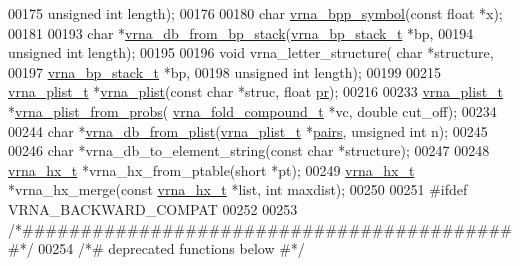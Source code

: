 \begin{DoxyCode}
00175                           \textcolor{keywordtype}{unsigned} \textcolor{keywordtype}{int} length);
00176 
00180 \textcolor{keywordtype}{char} \hyperlink{group__struct__utils_ga025bff1b27fa46534c8fae6980f64bb5}{vrna\_bpp\_symbol}(\textcolor{keyword}{const} \textcolor{keywordtype}{float} *x);
00181 
00193 \textcolor{keywordtype}{char} *\hyperlink{group__struct__utils_ga27bea2c241564af53a065982183389df}{vrna\_db\_from\_bp\_stack}(\hyperlink{group__data__structures_structvrna__bp__stack__s}{vrna\_bp\_stack\_t} *bp,
00194                             \textcolor{keywordtype}{unsigned} \textcolor{keywordtype}{int} length);
00195 
00196 \textcolor{keywordtype}{void} vrna\_letter\_structure( \textcolor{keywordtype}{char} *structure,
00197                             \hyperlink{group__data__structures_structvrna__bp__stack__s}{vrna\_bp\_stack\_t} *bp,
00198                             \textcolor{keywordtype}{unsigned} \textcolor{keywordtype}{int} length);
00199 
00215 \hyperlink{group__data__structures_structvrna__plist__s}{vrna\_plist\_t} *\hyperlink{group__struct__utils_gad4448f5d2c2da0e4ab1731a3586b2542}{vrna\_plist}(\textcolor{keyword}{const} \textcolor{keywordtype}{char} *struc, \textcolor{keywordtype}{float} \hyperlink{fold__vars_8h_ac98ec419070aee6831b44e5c700f090f}{pr});
00216 
00233 \hyperlink{group__data__structures_structvrna__plist__s}{vrna\_plist\_t} *\hyperlink{group__struct__utils_gaa3bf26a0ee2e9f2225afbaee44a37264}{vrna\_plist\_from\_probs}(
      \hyperlink{group__fold__compound_structvrna__fc__s}{vrna\_fold\_compound\_t} *vc, \textcolor{keywordtype}{double} cut\_off);
00234 
00244 \textcolor{keywordtype}{char} *\hyperlink{group__struct__utils_gab6a7a36c90836880f7ab09b9f6baf1af}{vrna\_db\_from\_plist}(\hyperlink{group__data__structures_structvrna__plist__s}{vrna\_plist\_t} *\hyperlink{group__struct__utils_ga6341cbb704924824e0236c1dce791032}{pairs}, \textcolor{keywordtype}{unsigned} \textcolor{keywordtype}{int} n);
00245 
00246 \textcolor{keywordtype}{char} *vrna\_db\_to\_element\_string(\textcolor{keyword}{const} \textcolor{keywordtype}{char} *structure);
00247 
00248 \hyperlink{structvrna__hx__s}{vrna\_hx\_t} *vrna\_hx\_from\_ptable(\textcolor{keywordtype}{short} *pt);
00249 \hyperlink{structvrna__hx__s}{vrna\_hx\_t} *vrna\_hx\_merge(\textcolor{keyword}{const} \hyperlink{structvrna__hx__s}{vrna\_hx\_t} *list, \textcolor{keywordtype}{int} maxdist);
00250 
00251 \textcolor{preprocessor}{#ifdef  VRNA\_BACKWARD\_COMPAT}
00252 
00253 \textcolor{comment}{/*###########################################*/}
00254 \textcolor{comment}{/*# deprecated functions below              #*/}

\end{DoxyCode}
